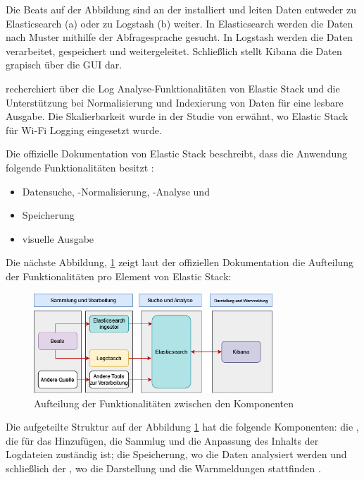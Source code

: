 Die Beats auf der Abbildung sind an der  installiert und leiten Daten entweder zu Elasticsearch (a) oder zu Logstash (b) weiter. In Elasticsearch werden die Daten nach Muster mithilfe der Abfragesprache  gesucht. In Logstash werden die Daten verarbeitet, gespeichert und weitergeleitet. Schließlich stellt Kibana die Daten grapisch über die \gls{GUI} dar\citep{Jain_LMELK}.

\cite{Advani_elkstakc} recherchiert über die Log Analyse-Funktionalitäten von Elastic Stack und die Unterstützung bei Normalisierung und Indexierung von Daten für eine lesbare Ausgabe. Die Skalierbarkeit wurde in der Studie von \cite{Wang_elkwifi} erwähnt, wo Elastic Stack für Wi-Fi Logging eingesetzt wurde.

Die offizielle Dokumentation von Elastic Stack beschreibt, dass die Anwendung folgende Funktionalitäten besitzt \citep{elastic_docs}:

\begin{itemize}[noitemsep]
   \item Datensuche, -Normalisierung, -Analyse und
   \item Speicherung
   \item visuelle Ausgabe
\end{itemize}

Die nächste Abbildung, \ref{fig:ElasticKomponenten} zeigt laut der offiziellen Dokumentation die Aufteilung der Funktionalitäten pro Element von Elastic Stack:

\begin{figure}[H]
   \centering
   \includegraphics[width=0.8\textwidth]{assets/ELK_Architektur.png}
   \caption[Aufteilung der Funktionalitäten zwischen den Komponenten]
   {Aufteilung der Funktionalitäten zwischen den Komponenten}
   \label{fig:ElasticKomponenten}
   \centering
\end{figure}

Die aufgeteilte Struktur auf der Abbildung \ref{fig:ElasticKomponenten} hat die folgende Komponenten: die , die für das Hinzufügen, die Sammlug und die Anpassung des Inhalts der Logdateien zuständig ist; die Speicherung, wo die Daten analysiert werden und schließlich der , wo die Darstellung und die Warnmeldungen stattfinden \citep{elastic_docs}.

